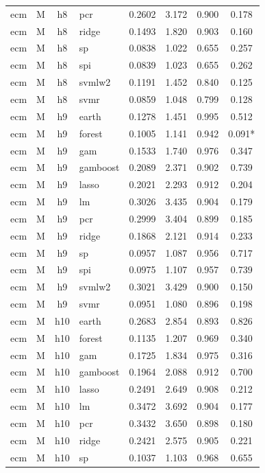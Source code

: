 \begin{ThreePartTable}
\begin{longtable}[t]{llclcccc}
ecm & M & h8 & pcr & 0.2602 & 3.172 & 0.900 & 0.178\\
ecm & M & h8 & ridge & 0.1493 & 1.820 & 0.903 & 0.160\\
ecm & M & h8 & sp & 0.0838 & 1.022 & 0.655 & 0.257\\
ecm & M & h8 & spi & 0.0839 & 1.023 & 0.655 & 0.262\\
ecm & M & h8 & svmlw2 & 0.1191 & 1.452 & 0.840 & 0.125\\
ecm & M & h8 & svmr & 0.0859 & 1.048 & 0.799 & 0.128\\
\addlinespace
ecm & M & h9 & earth & 0.1278 & 1.451 & 0.995 & 0.512\\
ecm & M & h9 & forest & 0.1005 & 1.141 & 0.942 & 0.091*\\
ecm & M & h9 & gam & 0.1533 & 1.740 & 0.976 & 0.347\\
ecm & M & h9 & gamboost & 0.2089 & 2.371 & 0.902 & 0.739\\
ecm & M & h9 & lasso & 0.2021 & 2.293 & 0.912 & 0.204\\
ecm & M & h9 & lm & 0.3026 & 3.435 & 0.904 & 0.179\\
ecm & M & h9 & pcr & 0.2999 & 3.404 & 0.899 & 0.185\\
ecm & M & h9 & ridge & 0.1868 & 2.121 & 0.914 & 0.233\\
ecm & M & h9 & sp & 0.0957 & 1.087 & 0.956 & 0.717\\
ecm & M & h9 & spi & 0.0975 & 1.107 & 0.957 & 0.739\\
ecm & M & h9 & svmlw2 & 0.3021 & 3.429 & 0.900 & 0.150\\
ecm & M & h9 & svmr & 0.0951 & 1.080 & 0.896 & 0.198\\
\addlinespace
ecm & M & h10 & earth & 0.2683 & 2.854 & 0.893 & 0.826\\
ecm & M & h10 & forest & 0.1135 & 1.207 & 0.969 & 0.340\\
ecm & M & h10 & gam & 0.1725 & 1.834 & 0.975 & 0.316\\
ecm & M & h10 & gamboost & 0.1964 & 2.088 & 0.912 & 0.700\\
ecm & M & h10 & lasso & 0.2491 & 2.649 & 0.908 & 0.212\\
ecm & M & h10 & lm & 0.3472 & 3.692 & 0.904 & 0.177\\
ecm & M & h10 & pcr & 0.3432 & 3.650 & 0.898 & 0.180\\
ecm & M & h10 & ridge & 0.2421 & 2.575 & 0.905 & 0.221\\
ecm & M & h10 & sp & 0.1037 & 1.103 & 0.968 & 0.655\\

\end{longtable}
\end{ThreePartTable}
